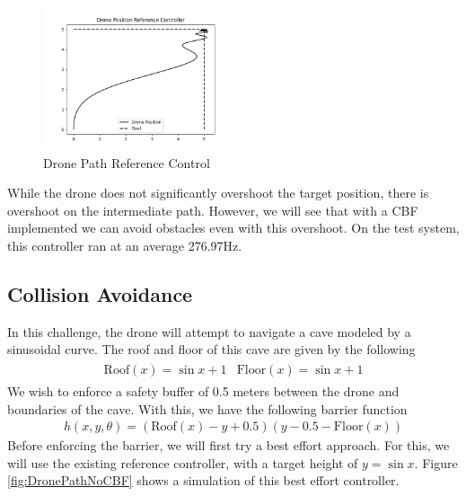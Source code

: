 \begin{figure}[H]
    \centering
    \includegraphics[width=0.5\textwidth]{Figures/Examples/Drone/DronePD.png}
    \caption{Drone Path Reference Control}
    \label{fig:dronepd}
\end{figure}

\noindent While the drone does not significantly overshoot the target position, there is overshoot on the intermediate path. However, we will see that with a CBF implemented we can avoid obstacles even with this overshoot. On the test system, this controller ran at an average 276.97Hz.

\subsection{Collision Avoidance}

\noindent In this challenge, the drone will attempt to navigate a cave modeled by a sinusoidal curve. The roof and floor of this cave are given by the following 
\begin{align}
    \begin{split}
        \text{Roof}(x) = \sin{x} + 1
    \end{split}
    \begin{split}
        \text{Floor}(x) = \sin{x} + 1
    \end{split}
\end{align}
\noindent We wish to enforce a safety buffer of 0.5 meters between the drone and boundaries of the cave. With this, we have the following barrier function
\begin{align}
    h(x, y, \theta) = (\text{Roof}(x) - y + 0.5)(y - 0.5 - \text{Floor}(x))
\end{align}
\noindent Before enforcing the barrier, we will first try a best effort approach. For this, we will use the existing reference controller, with a target height of $y = \sin{x}.$ Figure \ref{fig:DronePathNoCBF} shows a simulation of this best effort controller. 


